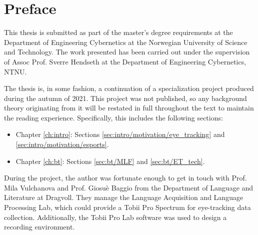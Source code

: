 \chapter*{Preface}

This thesis is submitted as part of the master's degree requirements at the Department of Engineering Cybernetics at the Norwegian University of Science and Technology. The work presented has been carried out under the supervision of Assoc Prof. Sverre Hendseth at the Department of Engineering Cybernetics, NTNU.


The thesis is, in some fashion, a continuation of a specialization project produced during the autumn of 2021. This project was not published, so any background theory originating from it will be restated in full throughout the text to maintain the reading experience. Specifically, this includes the following sections:
\begin{itemize}
    \item Chapter \ref{ch:intro}: Sections \ref{sec:intro/motivation/eye_tracking} and \ref{sec:intro/motivation/esports}.
    \item Chapter \ref{ch:bt}: Sections \ref{sec:bt/MLF} and \ref{sec:bt/ET_tech}.
\end{itemize}


During the project, the author was fortunate enough to get in touch with Prof. Mila Vulchanova and Prof. Giosuè Baggio from the Department of Language and Literature at Dragvoll. They manage the Language Acquisition and Language Processing Lab, which could provide a Tobii Pro Spectrum for eye-tracking data collection. Additionally, the Tobii Pro Lab software was used to design a recording environment. 

